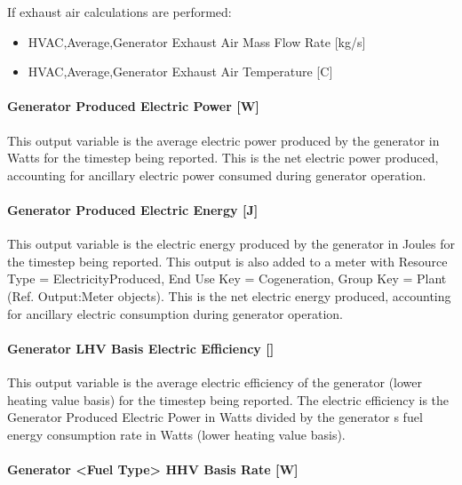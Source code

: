 If exhaust air calculations are performed:

\begin{itemize}
\item
  HVAC,Average,Generator Exhaust Air Mass Flow Rate {[}kg/s{]}
\item
  HVAC,Average,Generator Exhaust Air Temperature {[}C{]}
\end{itemize}

\paragraph{Generator Produced Electric Power {[}W{]}}\label{generator-produced-electric-power-w-1}

This output variable is the average electric power produced by the generator in Watts for the timestep being reported. This is the net electric power produced, accounting for ancillary electric power consumed during generator operation.

\paragraph{Generator Produced Electric Energy {[}J{]}}\label{generator-produced-electric-energy-j-1}

This output variable is the electric energy produced by the generator in Joules for the timestep being reported. This output is also added to a meter with Resource Type = ElectricityProduced, End Use Key = Cogeneration, Group Key = Plant (Ref. Output:Meter objects). This is the net electric energy produced, accounting for ancillary electric consumption during generator operation.

\paragraph{Generator LHV Basis Electric Efficiency {[]}}\label{generator-lhv-basis-electric-efficiency}

This output variable is the average electric efficiency of the generator (lower heating value basis) for the timestep being reported. The electric efficiency is the Generator Produced Electric Power in Watts divided by the generator s fuel energy consumption rate in Watts (lower heating value basis).

\paragraph{Generator \textless{}Fuel Type\textgreater{} HHV Basis Rate {[}W{]}}\label{generator-fuel-type-hhv-basis-rate-w}

